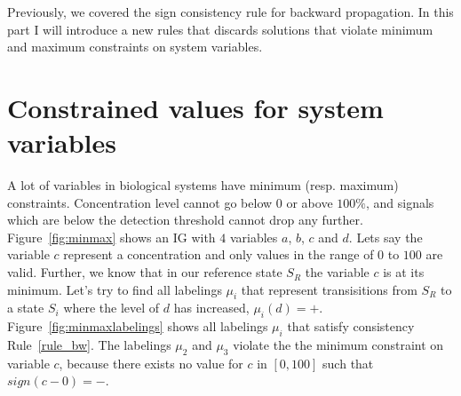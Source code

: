 Previously, we covered the sign consistency rule for backward propagation.
In this part I will introduce a new rules that discards solutions that
violate minimum and maximum constraints on system variables.

 
\section*{Constrained values for system variables} 

A lot of variables in biological systems have minimum (resp. maximum) constraints.
Concentration level cannot go below $0$ or above $100\%$, and 
signals which are below the detection threshold cannot drop any further.
Figure~\ref{fig:minmax} shows an IG with $4$ variables $a$, $b$, $c$ and $d$. 
Lets say the variable $c$ represent a concentration and only values in the range of $0$ to $100$ are valid.
Further, we know that in our reference state $S_R$ the variable $c$ is at its minimum.
Let's try to find all labelings $\mu_{i}$ that represent transisitions from $S_R$ to a state $S_i$ 
 where the level of $d$ has increased, $\mu_{i}(d)=\plus$.
Figure~\ref{fig:minmaxlabelings} shows all labelings $\mu_{i}$ that satisfy consistency Rule~\ref{rule_bw}.
The labelings $\mu_2$ and $\mu_3$ violate the the minimum constraint on variable $c$, 
 because there exists no value for $c$ in $[0,100]$ such that $ sign(c-0)=\minus$.


